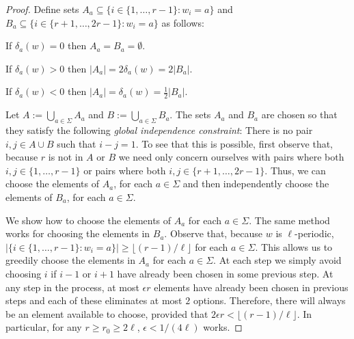 \documentclass{patmorin}
\begin{document}
\begin{proof}
    Define sets $A_a\subseteq\{i\in \{1,\ldots,r-1\}: w_i=a\}$ and $B_a\subseteq\{i\in\{r+1,\ldots,2r-1\}:w_i=a\}$ as follows:
    \begin{compactenum}
        \item If $\delta_a(w)=0$ then $A_a=B_a=\emptyset$.
        \item If $\delta_a(w)>0$ then $|A_a|=2\delta_a(w)=2|B_a|$.
        \item If $\delta_a(w)<0$ then $|A_a|=\delta_a(w)=\tfrac{1}{2}|B_a|$.
    \end{compactenum}
    Let $A:=\bigcup_{a\in\Sigma} A_a$ and $B:=\bigcup_{a\in\Sigma} B_a$.
    The sets $A_a$ and $B_a$ are chosen so that they satisfy the following \emph{global independence constraint}:  There is no pair $i,j\in A\cup B$ such that $i-j=1$.  To see that this is possible, first observe that, because $r$ is not in $A$ or $B$ we need only concern ourselves with pairs where both $i,j\in\{1,\ldots,r-1\}$ or pairs where both $i,j\in\{r+1,\ldots,2r-1\}$.  Thus, we can choose the elements of $A_a$, for each $a\in\Sigma$ and then independently choose the elements of $B_a$, for each $a\in\Sigma$.

    We show how to choose the elements of $A_a$ for each $a\in\Sigma$.  The same method works for choosing the elements in $B_a$. Observe that, because $w$ is $\ell$-periodic, $|\{i\in \{1,\ldots,r-1\}:w_i=a\}|\ge \lfloor(r-1)/\ell\rfloor$ for each $a\in\Sigma$.  This allows us to greedily choose the elements in $A_a$ for each $a\in\Sigma$. At each step we simply avoid choosing $i$ if $i-1$ or $i+1$ have already been chosen in some previous step.  At any step in the process, at most $\epsilon r$ elements have already been chosen in previous steps and each of these eliminates at most $2$ options.  Therefore, there will always be an element available to choose, provided that $2\epsilon r < \lfloor(r-1)/\ell\rfloor$.  In particular, for any $r\ge r_0\ge 2\ell$, $\epsilon < 1/(4\ell)$ works.


\end{proof}
\end{document}
